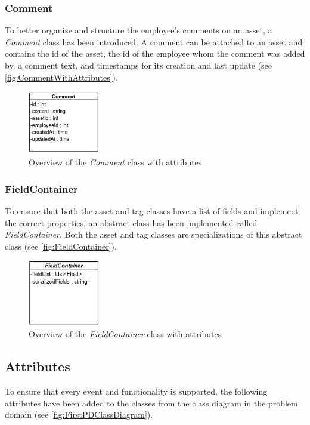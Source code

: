 \subsubsection{Comment}
To better organize and structure the employee's comments on an asset, a \textit{Comment} class has been introduced. A comment can be attached to an asset and contains the id of the asset, the id of the employee whom the comment was added by, a comment text, and timestamps for its creation and last update (see \autoref{fig:CommentWithAttributes}).
\begin{figure}[H]
    \centering
    \includegraphics[width=0.28\textwidth]{figures/Classes/CommentAttributes.png}
    \caption{Overview of the \textit{Comment} class with attributes}
    \label{fig:CommentWithAttributes}
\end{figure}

\subsubsection{FieldContainer}
To ensure that both the asset and tag classes have a list of fields and implement the correct properties, an abstract class has been implemented called \textit{FieldContainer}. Both the asset and tag classes are specializations of this abstract class (see \autoref{fig:FieldContainer}).
\begin{figure}[H]
    \centering
    \includegraphics[width=0.28\textwidth]{figures/Classes/FieldContainer.png}
    \caption{Overview of the \textit{FieldContainer} class with attributes}
    \label{fig:FieldContainer}
\end{figure}

\subsection{Attributes}
To ensure that every event and functionality is supported, the following attributes have been added to the classes from the class diagram in the problem domain (see \autoref{fig:FirstPDClassDiagram}).

